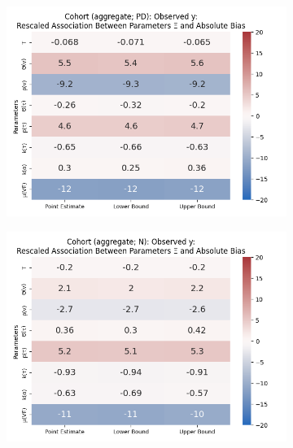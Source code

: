 \documentclass[12pt]{article}
\begin{document}
\begin{figure}[H]
\begin{subfigure}[t]{0.23\linewidth}
		\includegraphics[scale=0.25]{VEMethod_Drivers1b_FEest_Realistic2_Li_MSpec_Heatmap7.png}
	\end{subfigure}
	\begin{subfigure}[t]{0.23\linewidth}
		\centering
		\caption{}
		\includegraphics[scale=0.25]{VEMethod_Drivers1b_FEest_Realistic2_Li_MSpec_Heatmap8.png}
	\end{subfigure}
	

\end{figure}
\end{document}
